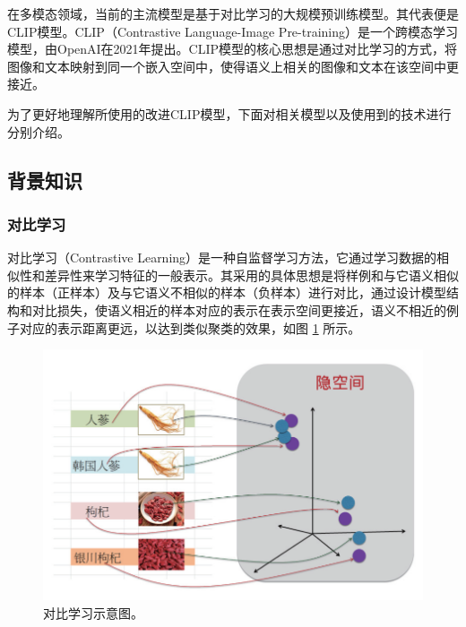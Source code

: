 \documentclass[a4paper]{zreport}
\begin{document}
在多模态领域，当前的主流模型是基于对比学习的大规模预训练模型。其代表便是CLIP模型。CLIP（Contrastive Language-Image Pre-training）是一个跨模态学习模型\cite{clip}，由OpenAI在2021年提出。CLIP模型的核心思想是通过对比学习的方式，将图像和文本映射到同一个嵌入空间中，使得语义上相关的图像和文本在该空间中更接近。

为了更好地理解所使用的改进CLIP模型，下面对相关模型以及使用到的技术进行分别介绍。

\subsection{背景知识}

\subsubsection{对比学习}

对比学习（Contrastive Learning）是一种自监督学习方法\cite{liu2021self}，它通过学习数据的相似性和差异性来学习特征的一般表示。其采用的具体思想是将样例和与它语义相似的样本（正样本）及与它语义不相似的样本（负样本）进行对比，通过设计模型结构和对比损失，使语义相近的样本对应的表示在表示空间更接近，语义不相近的例子对应的表示距离更远，以达到类似聚类的效果，如图 \ref{fig:cl1} 所示。

\begin{figure}[t]
\centering
\includegraphics[width=0.75\linewidth]{figures/cl1}
\caption{对比学习示意图。}
\label{fig:cl1}
\end{figure}
\end{document}
